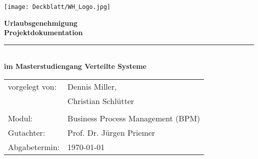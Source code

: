 \thispagestyle{plain}
\begin{titlepage}

\begin{center}

\texttt{[image: Deckblatt/WH\_Logo.jpg]}

\vspace{2cm}

\Huge{\textbf{Urlaubsgenehmigung}}\\[1.5ex]
\Large{\textbf{Projektdokumentation}}
\rule{\textwidth}{0.4pt}\\[3.0ex]

\large{\textbf{im Masterstudiengang Verteilte Systeme}}\\[3.0ex]

\normalsize
\begin{tabular}{ll}\\
	vorgelegt von: 
	& \quad Dennis Miller, \\[1.2ex]
	& \quad Christian Schlütter\\[1.2ex]
	& \quad \\[1.2ex]
	Modul:  & \quad Business Process Management (BPM) \\[1.2ex]
	Gutachter:  & \quad Prof. Dr. Jürgen Priemer \\[1.2ex]
	Abgabetermin:  & \quad \today\\[1.2ex]
\end{tabular}

\end{center}

\end{titlepage}
